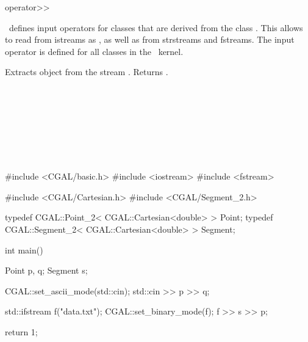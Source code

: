 

\ccHtmlNoClassLinks
\begin{ccRefFunction}{operator>>}  %


\ccDefinition
\cgal\  defines input operators for classes that are derived
from the class . This allows to read from istreams
as , as well as from strstreams and fstreams.
The input operator is defined for all classes in the \cgal\ kernel.


   {Extracts object  from the stream . Returns .}           
\ccSeeAlso
{} \\
 \\
  \\
  \\
 \\
 \\
 \\
 \\

\ccExample
\begin{cprog}

#include <CGAL/basic.h>
#include <iostream>
#include <fstream>

#include <CGAL/Cartesian.h>
#include <CGAL/Segment_2.h>

typedef CGAL::Point_2< CGAL::Cartesian<double> >     Point;
typedef CGAL::Segment_2< CGAL::Cartesian<double> >   Segment;

int
main()
{
    Point p, q;
    Segment s;

    CGAL::set_ascii_mode(std::cin);
    std::cin >> p >> q;

    std::ifstream f("data.txt");
    CGAL::set_binary_mode(f);
    f >> s >> p;

    return 1;
}
\end{cprog} 

\end{ccRefFunction}


